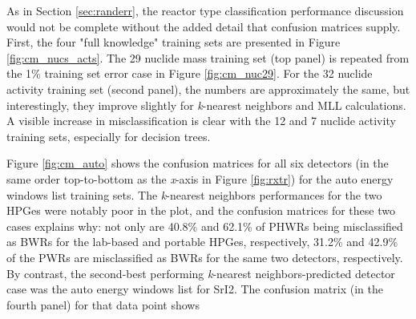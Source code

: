 As in Section \ref{sec:randerr}, the reactor type classification performance
discussion would not be complete without the added detail that confusion
matrices supply. First, the four "full knowledge" training sets are presented
in Figure \ref{fig:cm_nucs_acts}.  The 29 nuclide mass training set (top panel)
is repeated from the 1\% training set error case in Figure \ref{fig:cm_nuc29}.
For the 32 nuclide activity training set (second panel), the numbers are
approximately the same, but interestingly, they improve slightly for
\textit{k}-nearest neighbors and \gls{MLL} calculations.  A visible increase in
misclassification is clear with the 12 and 7 nuclide activity training sets,
especially for decision trees. 


Figure \ref{fig:cm_auto} shows the confusion matrices for all six detectors (in
the same order top-to-bottom as the \textit{x}-axis in Figure \ref{fig:rxtr})
for the auto energy windows list training sets. The \textit{k}-nearest
neighbors performances for the two \gls{HPGe}s were notably poor in the plot,
and the confusion matrices for these two cases explains why: not only are
40.8\% and 62.1\% of \gls{PHWR}s being misclassified as \gls{BWR}s for the
lab-based and portable \gls{HPGe}s, respectively, 31.2\% and 42.9\% of the
\gls{PWR}s are misclassified as \gls{BWR}s for the same two detectors,
respectively. By contrast, the second-best performing \textit{k}-nearest
neighbors-predicted detector case was the auto energy windows list for
\gls{SrI2}. The confusion matrix (in the fourth panel) for that data point 
shows 

